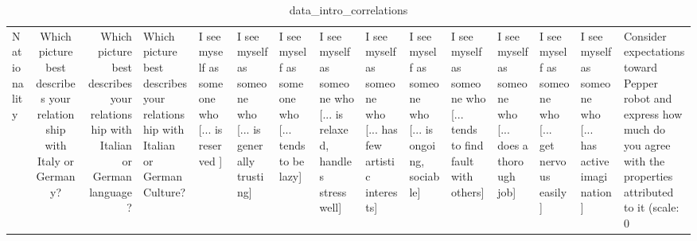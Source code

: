 \begin{table}
\caption{data_intro_correlations}
\label{tab:data_intro_correlations}
\begin{tabular}{lcr}
\toprule
Nationality & Which picture best describes your relationship with Italy or Germany? & Which picture best describes your relationship with Italian or German language? & Which picture best describes your relationship with Italian or German Culture? & I see myself as someone who  [... is reserved ] & I see myself as someone who  [... is generally trusting] & I see myself as someone who  [... tends to be lazy] & I see myself as someone who  [... is relaxed, handles stress well] & I see myself as someone who  [... has few artistic interests] & I see myself as someone who  [... is ongoing, sociable] & I see myself as someone who  [... tends to find fault with others] & I see myself as someone who  [... does a thorough job] & I see myself as someone who  [... get nervous easily] & I see myself as someone who  [... has active imagination] & Consider expectations toward Pepper robot and express how much do you agree with the properties attributed to it (scale: 0%
\end{tabular}
\end{table}
